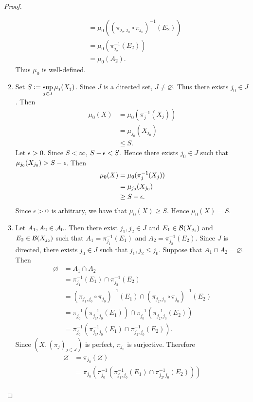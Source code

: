 \documentclass{book}
\begin{document}
\begin{proof}
\begin{enumerate}
\begin{align*}
			& = \mu_0((\pi_{j_2, j_0} \circ \pi_{j_0})^{-1}(E_2)) \\
			& = \mu_0(\pi_{j_2}^{-1}(E_2)) \\
			& = \mu_0(A_2).
		\end{align*}
		Thus $\mu_0$ is well-defined.
		\item Set $S \vcentcolon= \sup\limits_{j \in J} \mu_j(X_j)$. Since $J$ is a directed set, $J \neq \varnothing$. Thus there exists $j_0 \in J$. Then
		\begin{align*}
			\mu_0(X) 
			& = \mu_0(\pi_j^{-1}(X_j)) \\
			& = \mu_{j_0}(X_{j_0}) \\
			& \leq S.
		\end{align*}
		Let $\epsilon > 0$. Since $S < \infty$, $S - \epsilon < S$. Hence there exists $j_0 \in J$ such that $\mu_{j_0}(X_{j_0}) > S - \epsilon$. Then 
		\begin{align*}
			\mu_0(X) 
			& = \mu_0(\pi_j^{-1}(X_j)) \\
			& = \mu_{j_0}(X_{j_0}) \\
			& \geq S - \epsilon.
		\end{align*}
		Since $\epsilon > 0$ is arbitrary, we have that $\mu_0(X) \geq S$. Hence $\mu_0(X) = S$.
		\item Let $A_1, A_2 \in \mathcal{A}_0$. Then there exist $j_1, j_2 \in J$ and $E_1 \in \mathcal{B}(X_{j_1})$ and $E_2 \in \mathcal{B}(X_{j_2})$ such that $A_1 = \pi_{j_1}^{-1}(E_1)$ and $A_2 = \pi_{j_2}^{-1}(E_2)$. Since $J$ is directed, there exists $j_0 \in J$ such that $j_1, j_2 \leq j_0$. Suppose that $A_1 \cap A_2 = \varnothing$. Then  
		\begin{align*}
			\varnothing
			& = A_1 \cap A_2 \\
			& = \pi_{j_1}^{-1}(E_1) \cap \pi_{j_2}^{-1}(E_2) \\
			& = (\pi_{j_1, j_0} \circ \pi_{j_0})^{-1}(E_1) \cap  (\pi_{j_2, j_0} \circ \pi_{j_0})^{-1}(E_2) \\
			& = \pi_{j_0}^{-1}(\pi_{j_1, j_0}^{-1}(E_1)) \cap \pi_{j_0}^{-1}(\pi_{j_2, j_0}^{-1}(E_2)) \\
			& = \pi_{j_0}^{-1}(\pi_{j_1, j_0}^{-1}(E_1) \cap \pi_{j_2, j_0}^{-1}(E_2)).
		\end{align*}	
		Since $(X, (\pi_j)_{j \in J})$ is perfect, $\pi_{j_0}$ is surjective. Therefore
		\begin{align*}
			\varnothing
			& = \pi_{j_0}(\varnothing) \\
			& = \pi_{j_0}(\pi_{j_0}^{-1}(\pi_{j_1, j_0}^{-1}(E_1) \cap \pi_{j_2, j_0}^{-1}(E_2))) \\

\end{align*}
\end{enumerate}
\end{proof}
\end{document}

